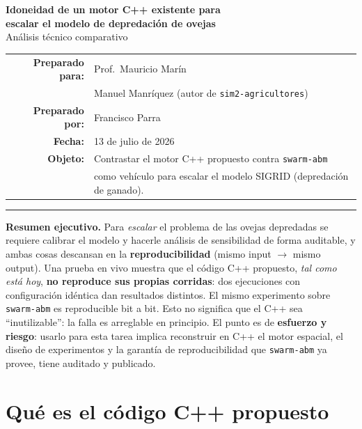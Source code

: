 \documentclass[11pt,a4paper]{article}
\newcommand{\code}[1]{\texttt{\small #1}}
\begin{document}
\begin{center}
{\LARGE\bfseries\color{acc} Idoneidad de un motor C++ existente para\\[2pt]
escalar el modelo de depredación de ovejas}\\[10pt]
{\large Análisis técnico comparativo}\\[14pt]
\begin{tabular}{rl}
\textbf{Preparado para:} & Prof.\ Mauricio Marín \\
 & Manuel Manríquez (autor de \code{sim2-agricultores}) \\[3pt]
\textbf{Preparado por:} & Francisco Parra \\[3pt]
\textbf{Fecha:} & 13 de julio de 2026 \\[3pt]
\textbf{Objeto:} & Contrastar el motor C++ propuesto contra \code{swarm-abm} \\
 & como vehículo para escalar el modelo SIGRID (depredación de ganado). \\
\end{tabular}
\end{center}

\vspace{4pt}
\hrule
\vspace{10pt}

\begin{tcolorbox}[colback=acc!6,colframe=acc,boxrule=0.6pt,arc=2pt]
\textbf{Resumen ejecutivo.} Para \emph{escalar} el problema de las ovejas
depredadas se requiere calibrar el modelo y hacerle análisis de sensibilidad de
forma auditable, y ambas cosas descansan en la \textbf{reproducibilidad}
(mismo input $\rightarrow$ mismo output). Una prueba en vivo muestra que el
código C++ propuesto, \emph{tal como está hoy}, \textbf{no reproduce sus propias
corridas}: dos ejecuciones con configuración idéntica dan resultados distintos.
El mismo experimento sobre \code{swarm-abm} es reproducible bit a bit. Esto no
significa que el C++ sea ``inutilizable'': la falla es arreglable en principio.
El punto es de \textbf{esfuerzo y riesgo}: usarlo para esta tarea implica
reconstruir en C++ el motor espacial, el diseño de experimentos y la garantía de
reproducibilidad que \code{swarm-abm} ya provee, tiene auditado y publicado.
\end{tcolorbox}

\section{Qué es el código C++ propuesto}
\end{document}
